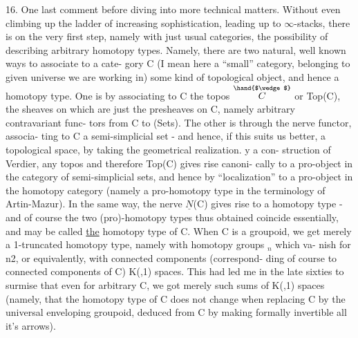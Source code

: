 

 16. One last comment before diving into more technical matters. Without
even climbing up the ladder of increasing sophistication, leading up
to $\infty$-stacks, there is on the very first step, namely with just usual
categories, the possibility of describing arbitrary homotopy types.
Namely, there are two natural, well known ways to associate to a cate-%
gory C (I mean here a ``small'' category, belonging to  given universe
we are working in) some kind of topological object, and hence a homotopy
type. One is by associating to C the topos $\overset{\hand{$\wedge$}}{C}$ or Top(C), the sheaves on
which are just the presheaves on C, namely arbitrary contravariant func-%
tors from C to (Sets). The other is through the nerve functor, associa-%
ting to C a semi-simplicial set - and hence, if this suits us better,
a topological space, by taking the geometrical realization. y a con-%
struction of Verdier, any topos and therefore Top(C) gives rise canoni-%
cally to a pro-object in the category of semi-simplicial sets, and hence
by ``localization'' to a pro-object in the homotopy category (namely a
pro-homotopy type in the terminology of Artin-Mazur). In the same way,
the nerve $\underline{N}$(C) gives rise to a homotopy type - and of course the two
(pro)-homotopy types thus obtained coincide essentially, and may be
called \uline{the} homotopy type of C. When C is a groupoid, we get merely
a 1-truncated homotopy type, namely with homotopy groups \hand{$\pi$}$_n$ which va-%
nish for n\hand{$\geqslant$}2, or equivalently, with connected components (correspond-%
ding of course to connected components of C) K(\hand{$\pi$},1) spaces. This had
led me  in the late sixties to  surmise that even for arbitrary C, we got
merely such sums of K(\hand{$\pi$},1) spaces (namely, that the homotopy type of C
does not change when replacing C by the universal enveloping groupoid,
deduced from C by  making formally invertible all it's arrows).
